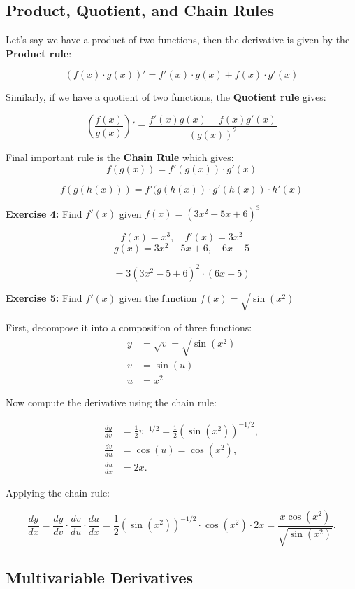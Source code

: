 \subsection{Product, Quotient, and Chain Rules}

Let's say we have a product of two functions, then the derivative is given by the \textbf{Product rule}:

\[
(f(x) \cdot g(x))' = f'(x) \cdot g(x) + f(x) \cdot g'(x)
\]

Similarly, if we have a quotient of two functions, the \textbf{Quotient rule} gives:

\[
\left( \frac{f(x)}{g(x)} \right)' = \frac{f'(x)g(x) - f(x)g'(x)}{(g(x))^2}
\]

Final important rule is the \textbf{Chain Rule} which gives:
\[
f(g(x)) = f'(g(x)) \cdot g'(x)
\]

\[f(g(h(x)))=f'(g(h(x)) \cdot g'(h(x)) \cdot h'(x)\]

\textbf{Exercise 4:} Find \( f'(x) \) given \(f(x) = (3x^2 - 5x + 6)^3\)

\[ f(x) = x^3, \quad f'(x) = 3x^2\]
\[ g(x) = 3x^2 -5x +6, \quad 6x - 5\]

\[= 3(3x^2 -5 + 6)^2 \cdot (6x - 5)\]

\textbf{Exercise 5:} Find \( f'(x) \) given the function \( f(x) = \sqrt{\sin(x^2)} \)

\bigskip

First, decompose it into a composition of three functions:
\begin{align*}
y &= \sqrt{v} = \sqrt{\sin(x^2)} \\
v &= \sin(u) \\
u &= x^2
\end{align*}

Now compute the derivative using the chain rule:

\begin{align*}
\frac{dy}{dv} &= \frac{1}{2} v^{-1/2} = \frac{1}{2} \left( \sin(x^2) \right)^{-1/2}, \\
\frac{dv}{du} &= \cos(u) = \cos(x^2), \\
\frac{du}{dx} &= 2x.
\end{align*}

Applying the chain rule:

\[
\frac{dy}{dx} = \frac{dy}{dv} \cdot \frac{dv}{du} \cdot \frac{du}{dx}
= \frac{1}{2} \left( \sin(x^2) \right)^{-1/2} \cdot \cos(x^2) \cdot 2x
= \frac{x \cos(x^2)}{\sqrt{\sin(x^2)}}.
\]

\subsection{Multivariable Derivatives}

